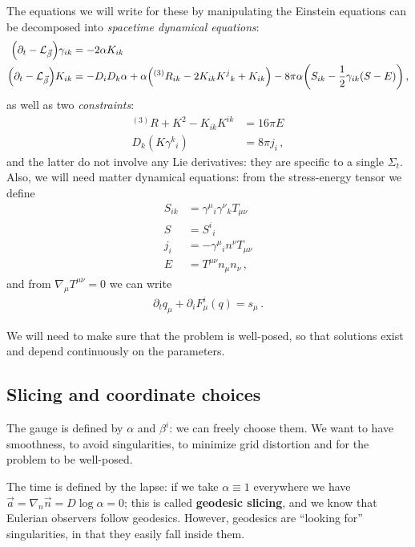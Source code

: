 \documentclass[main.tex]{subfiles}
\begin{document}
The equations we will write for these by manipulating the Einstein equations can be decomposed into \emph{spacetime dynamical equations}: 
%
\begin{align}
\qty(\partial_t - \mathcal{L}_{\vec{\beta}}) \gamma_{ik} &= - 2 \alpha K_{ik}  \\
\qty(\partial_t - \mathcal{L}_{\vec{\beta}}) K_{ik} &= - D_i D_k \alpha + \alpha \qty(^{(3)}R_{ik} - 2 K_{ik} K^{j}{}_k + K_{ik}) - 8 \pi \alpha \qty(S_{ik} - \frac{1}{2} \gamma_{ik} (S-E))
\,,
\end{align}
%
as well as two \emph{constraints}: 
%
\begin{align}
^{(3)} R + K^2 - K_{ik} K^{ik} &= 16 \pi E  \\
D_k (K \gamma^{k}{}_i ) &= 8 \pi j_i
\,,
\end{align}
%
and the latter do not involve any Lie derivatives: they are specific to a single \(\Sigma _t\). 
Also, we will need matter dynamical equations: from the stress-energy tensor we define 
%
\begin{align}
S_{ik} &= \gamma^{\mu }{}_{i} \gamma^{\nu }{}_k T_{\mu \nu }  \\
S &= S^{i}{}_i  \\
j_{i} &= - \gamma^{\mu }{}_i n^\nu T_{\mu \nu }  \\
E &= T^{\mu \nu } n_\mu n_\nu 
\,,
\end{align}
%
and from \(\nabla_\mu T^{\mu \nu } = 0\) we can write 
%
\begin{align}
\partial_t q_\mu + \partial_{i} F^{i}_{\mu }( q ) = s_\mu 
\,.
\end{align}

We will need to make sure that the problem is well-posed, so that solutions exist and depend continuously on the parameters. 

\subsection{Slicing and coordinate choices}

The gauge is defined by \(\alpha \) and \(\beta^{i} \): we can freely choose them. We want to have smoothness, to avoid singularities, to minimize grid distortion and for the problem to be well-posed. 

The time is defined by the lapse: if we take \(\alpha \equiv 1\) everywhere we have \(\vec{a} = \nabla_n \vec{n} = D \log \alpha = 0\); this is called \textbf{geodesic slicing}, and we know that Eulerian observers follow geodesics. 
However, geodesics are ``looking for'' singularities, in that they easily fall inside them. 
\end{document}
